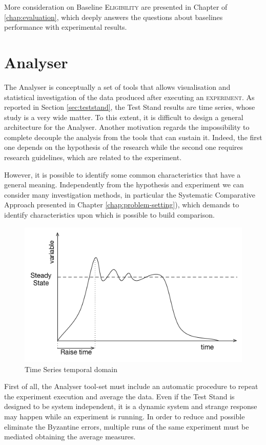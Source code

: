 More consideration on Baseline \textsc{Eligibility} are presented in Chapter of \ref{chap:evaluation}, which deeply answers the questions about baselines performance with experimental results. 

\section{Analyser}\label{sec:analyser}

The Analyser is conceptually a set of tools that allows visualisation and statistical investigation of the data produced after executing an \textsc{experiment}. As reported in Section \ref{sec:teststand}, the Test Stand results are time series, whose study is a very wide matter. To this extent, it is difficult to design a general architecture for the Analyser. Another motivation regards the impossibility to complete decouple the analysis from the tools that can sustain it. Indeed, the first one depends on the hypothesis of the research while the second one requires research guidelines, which are related to the experiment. 

However, it is possible to identify some common characteristics that have a general meaning. Independently from the hypothesis and  experiment we can consider many investigation methods, in particular the Systematic Comparative Approach presented in Chapter \ref{chap:problem-setting}), which demands to identify characteristics upon which is possible to build comparison. 

\begin{figure}[tbh]
  \centering
	\includegraphics[width=0.5\linewidth]{images/steady-state}
	\caption{Time Series temporal domain} 	
  	\label{fig:steady-state}
\end{figure}

First of all, the Analyser tool-set must include an automatic procedure to repeat the experiment execution and average the data. Even if the Test Stand is designed to be system independent, it is a dynamic system and strange response may happen while an experiment is running. In order to reduce and possible eliminate the Byzantine errors, multiple runs of the same experiment must be mediated obtaining the average measures. 


